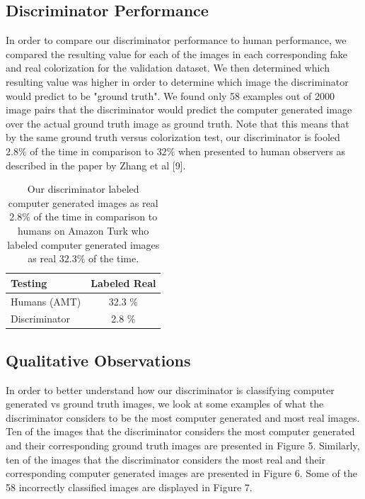 \documentclass[10pt,twocolumn,letterpaper]{article}
\begin{document}
\subsection{Discriminator Performance}

In order to compare our discriminator performance to human performance, we compared the resulting value for each of the images in each corresponding fake and real colorization for the validation dataset. We then determined which resulting value was higher in order to determine which image the discriminator would predict to be "ground truth". We found only 58 examples out of 2000 image pairs that the discriminator would predict the computer generated image over the actual ground truth image as ground truth. Note that this means that by the same ground truth versus colorization test, our discriminator is fooled $2.8\%$ of the time in comparison to $32\%$ when presented to human observers as described in the paper by Zhang et al [9]. 

\begin{table}
\begin{center}
\begin{tabular}[H]{|l|c|}
\hline
Testing & Labeled Real \\
\hline \hline
Humans (AMT) & 32.3 $\%$ \\
Discriminator & 2.8 $\%$ \\
\hline
\end{tabular}
\end{center}
\caption{Our discriminator labeled computer generated images as real $2.8\%$ of the time in comparison to humans on Amazon Turk who labeled computer generated images as real $32.3\%$ of the time.}
\end{table}

\subsection{Qualitative Observations}

In order to better understand how our discriminator is classifying computer generated vs ground truth images, we look at some examples of what the discriminator considers to be the most computer generated and most real images. Ten of the images that the discriminator considers the most computer generated and their corresponding ground truth images are presented in Figure 5. Similarly, ten of the images that the discriminator considers the most real and their corresponding computer generated images are presented in Figure 6. Some of the 58 incorrectly classified images are displayed in Figure 7. 
\end{document}
